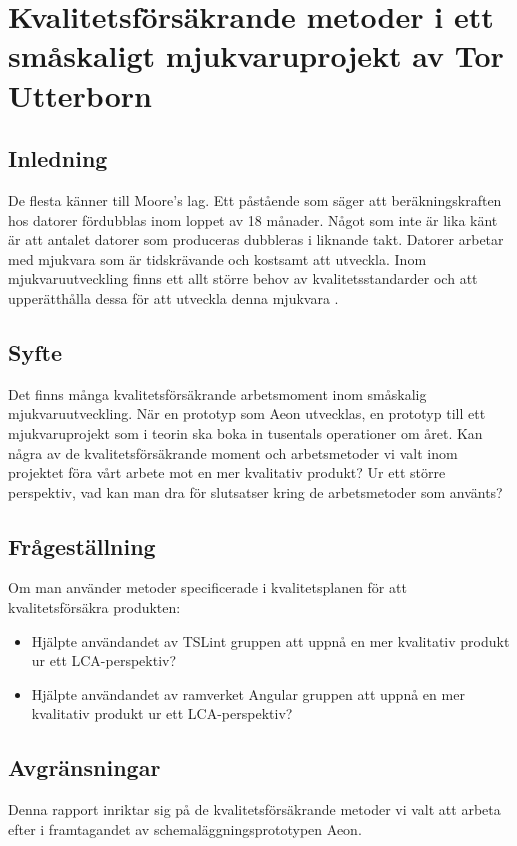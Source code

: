 \chapter{Kvalitetsförsäkrande metoder i ett småskaligt mjukvaruprojekt av Tor Utterborn}

\section{Inledning}

De flesta känner till Moore's lag. Ett påstående som säger att beräkningskraften hos datorer fördubblas inom loppet av 18 månader. 
Något som inte är lika känt är att antalet datorer som produceras dubbleras i liknande takt. \cite{greenbiz}
Datorer arbetar med mjukvara som är tidskrävande och kostsamt att utveckla. Inom mjukvaruutveckling finns ett allt större behov av kvalitetsstandarder och att upperätthålla dessa för att utveckla denna mjukvara \cite{linkedin}.

\section{Syfte}

Det finns många kvalitetsförsäkrande arbetsmoment inom småskalig mjukvaruutveckling. När en prototyp som Aeon utvecklas, en prototyp till ett mjukvaruprojekt som i teorin ska boka in tusentals operationer om året. Kan några av de kvalitetsförsäkrande moment och arbetsmetoder vi valt inom projektet föra vårt arbete mot en mer kvalitativ produkt? Ur ett större perspektiv, vad kan man dra för slutsatser kring de arbetsmetoder som använts?

\section{Frågeställning}

Om man använder metoder specificerade i kvalitetsplanen för att kvalitetsförsäkra produkten: 
\begin{itemize}
	\item Hjälpte användandet av TSLint gruppen att uppnå en mer kvalitativ produkt ur ett LCA-perspektiv?
	\item Hjälpte användandet av ramverket Angular gruppen att uppnå en mer kvalitativ produkt ur ett LCA-perspektiv?
\end{itemize}

\section{Avgränsningar}
Denna rapport inriktar sig på de kvalitetsförsäkrande metoder vi valt att arbeta efter i framtagandet av schemaläggningsprototypen Aeon.

